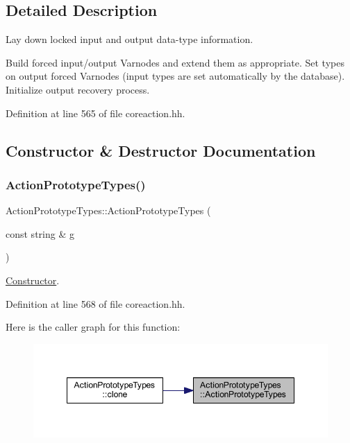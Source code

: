 \subsection{Detailed Description}
Lay down locked input and output data-\/type information. 

Build forced input/output Varnodes and extend them as appropriate. Set types on output forced Varnodes (input types are set automatically by the database). Initialize output recovery process. 

Definition at line 565 of file coreaction.\+hh.



\subsection{Constructor \& Destructor Documentation}
\mbox{\label{class_action_prototype_types_af8156a426556dffd3f1bcdbd768bd318}} 
\subsubsection{\texorpdfstring{ActionPrototypeTypes()}{ActionPrototypeTypes()}}
{\footnotesize\ttfamily Action\+Prototype\+Types\+::\+Action\+Prototype\+Types (\begin{DoxyParamCaption}\item[{const string \&}]{g }\end{DoxyParamCaption})\hspace{0.3cm}{\ttfamily [inline]}}



\mbox{\hyperlink{class_constructor}{Constructor}}. 



Definition at line 568 of file coreaction.\+hh.

Here is the caller graph for this function\+:
\nopagebreak
\begin{figure}[H]
\begin{center}
\leavevmode
\includegraphics[width=348pt]{class_action_prototype_types_af8156a426556dffd3f1bcdbd768bd318_icgraph}
\end{center}
\end{figure}


